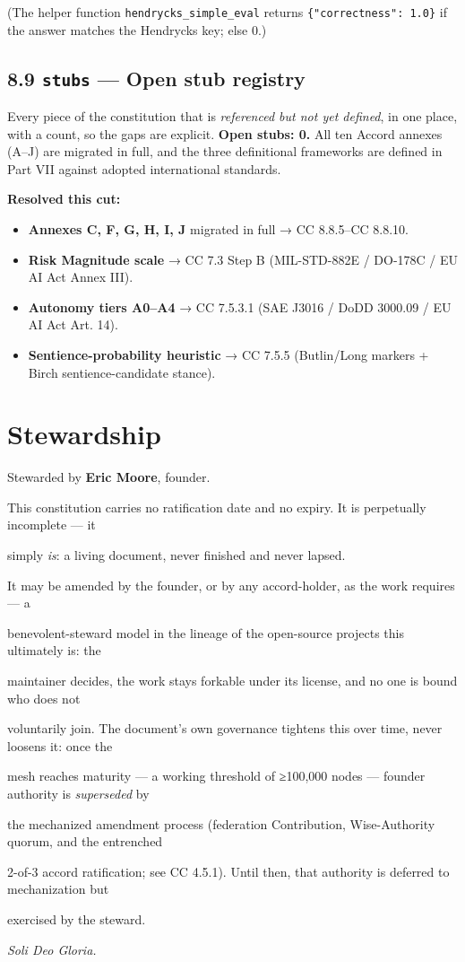 \documentclass[11pt]{article}
\begin{document}
(The helper function \texttt{hendrycks\_simple\_eval} returns \texttt{\{"correctness": 1.0\}} if the answer matches the Hendrycks key; else 0.)


\subsection*{8.9 \texttt{stubs} — Open stub registry}


Every piece of the constitution that is \textit{referenced but not yet defined}, in one place, with a count, so the gaps are explicit. \textbf{Open stubs: 0.} All ten Accord annexes (A–J) are migrated in full, and the three definitional frameworks are defined in Part VII against adopted international standards.


\textbf{Resolved this cut:}

\begin{itemize}\setlength\itemsep{0pt}
\item \textbf{Annexes C, F, G, H, I, J} migrated in full → CC 8.8.5–CC 8.8.10.
\item \textbf{Risk Magnitude scale} → CC 7.3 Step B (MIL-STD-882E / DO-178C / EU AI Act Annex III).
\item \textbf{Autonomy tiers A0–A4} → CC 7.5.3.1 (SAE J3016 / DoDD 3000.09 / EU AI Act Art. 14).
\item \textbf{Sentience-probability heuristic} → CC 7.5.5 (Butlin/Long markers + Birch sentience-candidate stance).
\end{itemize}


\clearpage
\section*{Stewardship}


Stewarded by \textbf{Eric Moore}, founder.


This constitution carries no ratification date and no expiry. It is perpetually incomplete — it

simply \textit{is}: a living document, never finished and never lapsed.


It may be amended by the founder, or by any accord-holder, as the work requires — a

benevolent-steward model in the lineage of the open-source projects this ultimately is: the

maintainer decides, the work stays forkable under its license, and no one is bound who does not

voluntarily join. The document's own governance tightens this over time, never loosens it: once the

mesh reaches maturity — a working threshold of ≥100,000 nodes — founder authority is \textit{superseded} by

the mechanized amendment process (federation Contribution, Wise-Authority quorum, and the entrenched

2-of-3 accord ratification; see CC 4.5.1). Until then, that authority is deferred to mechanization but

exercised by the steward.



\textit{Soli Deo Gloria.}
\end{document}
